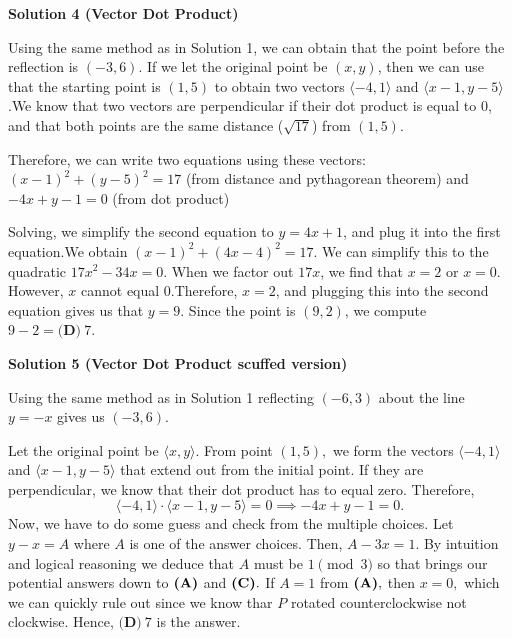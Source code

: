 \begin{enumerate}
 



\textbf{Solution 4 (Vector Dot Product)}

Using the same method as in Solution 1, we can obtain that the point before the reflection is $(-3,6)$. If we let the original point be $(x, y)$, then we can use that the starting point is $(1,5)$ to obtain two vectors $\langle -4,1 \rangle$ and $\langle x-1, y-5 \rangle$.We know that two vectors are perpendicular if their dot product is equal to $0$, and that both points are the same distance ($\sqrt {17}$) from $(1,5)$. 

 Therefore, we can write two equations using these vectors:$(x-1)^2 + (y-5)^2 = 17$ (from distance and pythagorean theorem) and $-4x+y-1 = 0$ (from dot product)

 Solving, we simplify the second equation to $y=4x+1$, and plug it into the first equation.We obtain $(x-1)^2 + (4x-4)^2 = 17$. We can simplify this to the quadratic $17x^2-34x=0$. When we factor out $17x$, we find that $x = 2$ or $x = 0$. However, $x$ cannot equal $0$.Therefore, $x = 2$, and plugging this into the second equation gives us that $y = 9$. Since the point is $(9, 2)$, we compute $9-2 = \boxed{\textbf{(D)} ~7}$.

 


 



\textbf{Solution 5 (Vector Dot Product scuffed version)}

Using the same method as in Solution 1 reflecting $(-6,3)$ about the line $y = -x$ gives us $(-3,6).$

 Let the original point be $\langle x,y \rangle.$ From point $(1,5),$ we form the vectors $\langle -4,1 \rangle$ and $\langle x-1, y-5 \rangle$ that extend out from the initial point. If they are perpendicular, we know that their dot product has to equal zero. Therefore, 
 \[\langle -4,1 \rangle \cdot \langle x-1, y-5 \rangle = 0 \implies -4x+y-1= 0.\]Now, we have to do some guess and check from the multiple choices. Let $y - x = A$ where $A$ is one of the answer choices. Then, $A -3x = 1.$ By intuition and logical reasoning we deduce that $A$ must be $1 \pmod 3$ so that brings our potential answers down to $\text{\textbf{(A)}}$ and $\text{\textbf{(C)}}.$ If $A = 1$ from $\text{\textbf{(A)}},$ then $x = 0,$ which we can quickly rule out since we know thar $P$ rotated counterclockwise not clockwise. Hence, $\boxed{\textbf{(D)} ~7}$ is the answer.

 



\end{enumerate}
